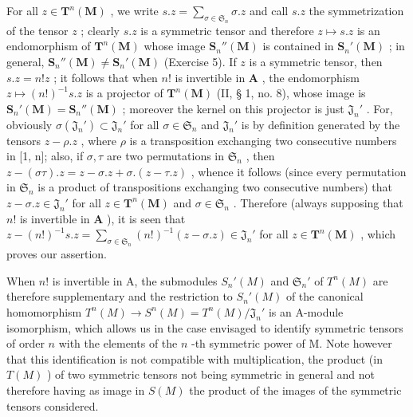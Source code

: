 For all \(z \in \mathbf{T}^n(\mathbf{M})\) , we write \(s.z = \sum_{\sigma \in \mathfrak{S}_n} \sigma.z\) and call \(s.z\) the symmetrization of the tensor \(z\) ; clearly \(s.z\) is a symmetric tensor and therefore \(z \mapsto s.z\) is an endomorphism of \(\mathbf{T}^n(\mathbf{M})\) whose image \(\mathbf{S}_n''(\mathbf{M})\) is contained in \(\mathbf{S}_n'(\mathbf{M})\) ; in general, \(\mathbf{S}_n''(\mathbf{M}) \neq \mathbf{S}_n'( \mathbf{M})\) (Exercise 5). If \(z\) is a symmetric tensor, then \(s.z = n!z\) ; it follows that when \(n!\) is invertible in \(\mathbf{A}\) , the endomorphism \(z \mapsto (n!)^{-1}s.z\) is a projector of \(\mathbf{T}^n(\mathbf{M})\) (II, § 1, no. 8), whose image is \(\mathbf{S}_n'(\mathbf{M}) = \mathbf{S}_n''(\mathbf{M})\) ; moreover the kernel on this projector is just \(\mathfrak{J}_n'\) . For, obviously \(\sigma(\mathfrak{J}_n') \subset \mathfrak{J}_n'\) for all \(\sigma \in \mathfrak{S}_n\) and \(\mathfrak{J}_n'\) is by definition generated by the tensors \(z - \rho.z\) , where \(\rho\) is a transposition exchanging two consecutive numbers in {[}1, n{]}; also, if \(\sigma, \tau\) are two permutations in \(\mathfrak{S}_n\) , then \(z - (\sigma\tau).z = z - \sigma.z + \sigma.(z - \tau.z)\) , whence it follows (since every permutation in \(\mathfrak{S}_n\) is a product of transpositions exchanging two consecutive numbers) that \(z - \sigma.z \in \mathfrak{J}_n'\) for all \(z \in \mathbf{T}^n(\mathbf{M})\) and \(\sigma \in \mathfrak{S}_n\) . Therefore (always supposing that \(n!\) is invertible in \(\mathbf{A}\) ), it is seen that \(z - (n!)^{-1}s.z = \sum_{\sigma \in \mathfrak{S}_n}(n!)^{-1}(z - \sigma.z) \in \mathfrak{J}_n'\) for all \(z \in \mathbf{T}^n(\mathbf{M})\) , which proves our assertion.

When \(n!\) is invertible in A, the submodules \(S_n'(M)\) and \(\mathfrak{S}_n'\) of \(T^n(M)\) are therefore supplementary and the restriction to \(S_n'(M)\) of the canonical homomorphism \(T^n(M) \to S^n(M) = T^n(M)/\mathfrak{J}_n'\) is an A-module isomorphism, which allows us in the case envisaged to identify symmetric tensors of order \(n\) with the elements of the \(n\) -th symmetric power of M. Note however that this identification is not compatible with multiplication, the product (in \(T(M)\) ) of two symmetric tensors not being symmetric in general and not therefore having as image in \(S(M)\) the product of the images of the symmetric tensors considered.

